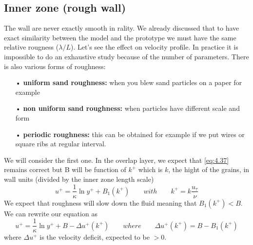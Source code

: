 	
	\subsection{Inner zone (rough wall)}
		The wall are never exactly smooth in rality. We already discussed that to have exact similarity between the model and the prototype we must have the same relative rougness ($\lambda /L$). Let's see the effect on velocity profile. In practice it is impossible to do an exhaustive study because of the number of parameters. There is also various forms of roughness: \\
		
		\begin{itemize}
			\item[•] \textbf{uniform sand roughness:} when you blew sand particles on a paper for example 
			\item[•] \textbf{non uniform sand roughness:} when particles have different scale and form
			\item[•] \textbf{periodic roughness:} this can be obtained for example if we put wires or square ribs at regular interval. \\
		\end{itemize}
		
		We will consider the first one. In the overlap layer, we expect that \eqref{eq:4.37} remains correct but B will be function of $k^+$ which is $k$, the hight of the grains, in wall units (divided by the inner zone length scale)
		\begin{equation}
			u^+ = \frac{1}{\kappa}\ln y^+ + B_1(k^+) \qquad with \qquad k^+ =k \frac{u_\tau}{\nu}
		\end{equation}
		We expect that roughness will slow down the fluid meaning that $B_1(k^+) < B$. We can rewrite our equation as 
		\begin{equation}
			u^+ = \frac{1}{\kappa}\ln y^+ + B - \Delta u^+ (k^+) \qquad where \qquad \Delta u^+ (k^+) = B - B_1(k^+)
		\end{equation}
		where $\Delta u^+$ is the velocity deficit, expected to be $>0$.\\
		
